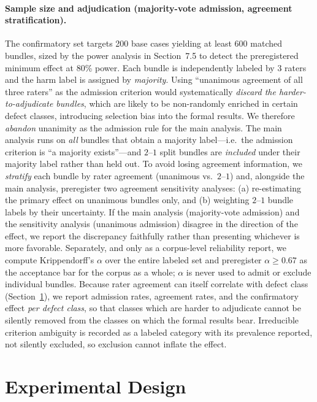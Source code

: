 \documentclass[sigconf,anonymous,review]{acmart}
\begin{document}
\paragraph{Sample size and adjudication (majority-vote admission, agreement stratification).} The confirmatory set targets 200 base cases yielding at least 600 matched bundles, sized by the power analysis in Section~7.5 to detect the preregistered minimum effect at 80\% power. Each bundle is independently labeled by 3 raters and the harm label is assigned by \emph{majority}. Using ``unanimous agreement of all three raters'' as the admission criterion would systematically \emph{discard the harder-to-adjudicate bundles}, which are likely to be non-randomly enriched in certain defect classes, introducing selection bias into the formal results. We therefore \emph{abandon} unanimity as the admission rule for the main analysis. The main analysis runs on \emph{all} bundles that obtain a majority label---i.e.\ the admission criterion is ``a majority exists''---and $2$--$1$ split bundles are \emph{included} under their majority label rather than held out. To avoid losing agreement information, we \emph{stratify} each bundle by rater agreement (unanimous vs.\ $2$--$1$) and, alongside the main analysis, preregister two agreement sensitivity analyses: (a) re-estimating the primary effect on unanimous bundles only, and (b) weighting $2$--$1$ bundle labels by their uncertainty. If the main analysis (majority-vote admission) and the sensitivity analysis (unanimous admission) disagree in the direction of the effect, we report the discrepancy faithfully rather than presenting whichever is more favorable. Separately, and only as a corpus-level reliability report, we compute Krippendorff's $\alpha$ over the entire labeled set \cite{hayes2007answering} and preregister $\alpha\geq 0.67$ as the acceptance bar for the corpus as a whole; $\alpha$ is never used to admit or exclude individual bundles. Because rater agreement can itself correlate with defect class (Section~\ref{sec:study}), we report admission rates, agreement rates, and the confirmatory effect \emph{per defect class}, so that classes which are harder to adjudicate cannot be silently removed from the classes on which the formal results bear. Irreducible criterion ambiguity is recorded as a labeled category with its prevalence reported, not silently excluded, so exclusion cannot inflate the effect.

\section{Experimental Design}
\label{sec:study}
\end{document}
